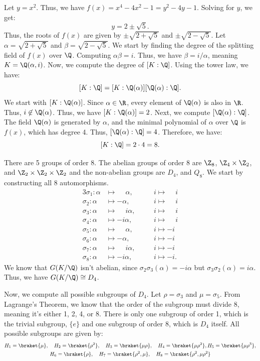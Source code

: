 \begin{solution}
  Let $y = x^2$. Thus, we have $f(x) = x^4 - 4x^2 - 1 = y^2 - 4y - 1$. Solving for $y$, we get:
  \[%
    y = 2 \pm \sqrt{5}
  .\]%
  Thus, the roots of $f(x)$ are given by $\pm\sqrt{2 + \sqrt{5}}$ and $\pm\sqrt{2 - \sqrt{5}}$. Let $\alpha = \sqrt{2 + \sqrt{5}}$ and $\beta = \sqrt{2 - \sqrt{5}}$. We start by finding the degree of the splitting field of $f(x)$ over $\Q$. Computing $\alpha\beta = i$. Thus, we have $\beta = i/\alpha$, meaning $K = \Q(\alpha, i)$. Now, we compute the degree of $[K : \Q]$. Using the tower law, we have:
  \[%
    [K : \Q] = [K : \Q(\alpha)][\Q(\alpha) : \Q]
  .\]%
  We start with $[K : \Q(\alpha)]$. Since $\alpha \in \R$, every element of $\Q(\alpha)$ is also in $\R$. Thus, $i \not\in \Q(\alpha)$. Thus, we have $[K : \Q(\alpha)] = 2$. Next, we compute $[\Q(\alpha) : \Q]$. The field $\Q(\alpha)$ is generated by $\alpha$, and the minimal polynomial of $\alpha$ over $\Q$ is $f(x)$, which has degree 4. Thus, $[\Q(\alpha) : \Q] = 4$. Therefore, we have:
  \[%
    [K : \Q] = 2 \cdot 4 = 8
  .\]%

  There are 5 groups of order 8. The abelian groups of order 8 are $\Z_8$, $\Z_4 \times \Z_2$, and $\Z_2 \times \Z_2 \times \Z_2$ and the non-abelian groups are $D_4$, and $Q_8$. We start by constructing all 8 automorphisms.
  \begin{alignat*}{3}
    \sigma_1 : \alpha &\mapsto \phantom{-}\alpha,\quad&& i \mapsto \phantom{-}i \\
    \sigma_2 : \alpha &\mapsto -\alpha,\quad&& i  \mapsto \phantom{-}i \\
    \sigma_3 : \alpha &\mapsto \phantom{-}i\alpha,\quad&& i \mapsto \phantom{-}i \\
    \sigma_4 : \alpha &\mapsto -i\alpha,\quad&& i \mapsto \phantom{-}i \\
    \sigma_5 : \alpha &\mapsto \phantom{-}\alpha,\quad&& i \mapsto -i \\
    \sigma_6 : \alpha &\mapsto -\alpha,\quad&& i \mapsto -i \\
    \sigma_7 : \alpha &\mapsto \phantom{-}i\alpha,\quad&& i \mapsto -i \\
    \sigma_8 : \alpha &\mapsto -i\alpha,\quad&& i \mapsto -i
  .\end{alignat*}
  We know that $G(K/\Q)$ isn't abelian, since $\sigma_2\sigma_3(\alpha) = -i\alpha$ but $\sigma_3\sigma_2(\alpha) = i\alpha$. Thus, we have $G(K/\Q) \cong D_4$.

  Now, we compute all possible subgroups of $D_4$. Let $\rho = \sigma_3$ and $\mu = \sigma_5$.
  From Lagrange's Theorem, we know that the order of the subgroup must divide 8, meaning it's either 1, 2, 4, or 8. There is only one subgroup of order 1, which is the trivial subgroup, $\{e\}$ and one subgroup of order 8, which is $D_4$ itself. All possible subgroups are given by:
  \begin{gather*}
    H_1 = \braket{\mu}, \quad H_2 = \braket{\rho^2}, \quad H_3 = \braket{\mu\rho}, \quad H_4 = \braket{\mu\rho^2}, H_5 = \braket{\mu\rho^3}, \\
    H_6 = \braket{\rho}, \quad H_7 = \braket{\rho^2, \mu}, \quad H_8 = \braket{\rho^2, \mu\rho^2}
  \end{gather*}


\end{solution}
